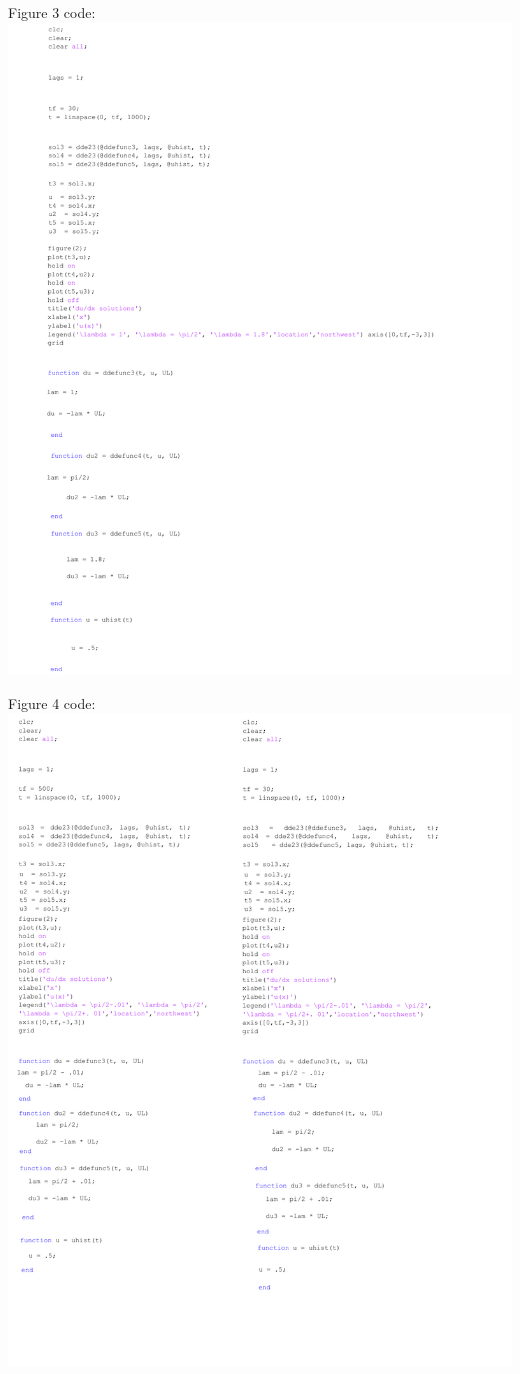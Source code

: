 \documentclass{article}
\begin{document}
\begin{center}
    \LARGE Figure 3 code: 
    \includegraphics[width=15cm]{du_solutions(5).pdf}
\end{center}
\newpage
\begin{center}
    \LARGE Figure 4 code: 
    \includegraphics[width=15cm]{lam_close.pdf}
\end{center}
\end{document}
